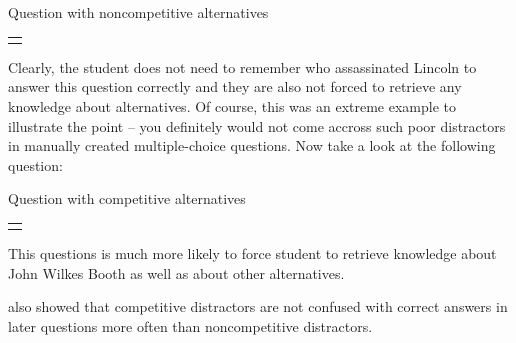 \documentclass[a4paper, 12pt, twoside]{fithesis2}		%
\renewcommand{\_}{\leavevmode \kern0.07em\vbox{\hrule width0.4em}}
\newcounter{choice}
\renewcommand\thechoice{\Alph{choice}}
\newcommand\choicelabel{\thechoice.}
\newenvironment{choices}%
  {\vspace{0.8em}\list{\choicelabel}%
     {\usecounter{choice}\def\makelabel##1{\hss\llap{##1}}%
       \settowidth{\leftmargin}{W.\hskip\labelsep\hskip 0.01em}%
       \def\choice{%
         \item
       } %
       \labelwidth\leftmargin\advance\labelwidth-\labelsep
       \topsep=0pt
       \partopsep=0pt
     }%
  }%
  {\vspace{-0.7em}\endlist}
\newenvironment{question}
{
  \begin{center}
  \begin{tabular}{p{0.9\textwidth}}
  \vskip 0.05em
}
{
  \\
  \end{tabular}
  \end{center}
}
\newcommand{\sentenceGap}{\rule{1.5cm}{0.4pt}~}
\begin{document}
\begin{exercise}
\caption{Question with noncompetitive alternatives}%
  \begin{question}
  Lincoln was assassinated by \sentenceGap , a Confederate sympathizer.
  \begin{choices}
    \choice Emancipation Proclamation
    \choice John Wilkes Booth
    \choice Illinois
    \choice Department of Agriculture
  \end{choices}
  \end{question}
\end{exercise}

Clearly, the student does not need to remember who assassinated Lincoln to answer this question correctly and they are also not forced to retrieve any knowledge about alternatives.
Of course, this was an extreme example to illustrate the point -- you definitely would not come accross such poor distractors in manually created multiple-choice questions.
Now take a look at the following question:

\begin{exercise}
\caption{Question with competitive alternatives}%
  \begin{question}
  Lincoln was assassinated by \sentenceGap , a Confederate sympathizer.
  \begin{choices}
    \choice Thomas N. Conrad
    \choice Robert E. Lee
    \choice John Wilkes Booth
    \choice Ward Hill Lamon
  \end{choices}
  \end{question}
\end{exercise}

This questions is much more likely to force student to retrieve knowledge about John Wilkes Booth as well as about other alternatives.

\cite{optimizing-multiple-choice} also showed that competitive distractors are not confused with correct answers in later questions more often than noncompetitive distractors.
\end{document}
